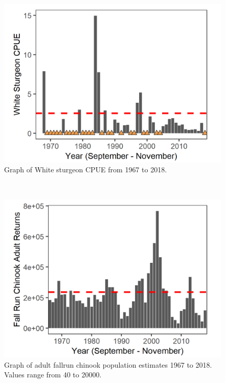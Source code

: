 \documentclass[
]{book}
\begin{document}
\begin{panel-grid}
\begin{columns-nocenter}
\begin{column800}
\begin{expand}
\begin{figure}
\includegraphics[width=15.25in]{figures/WST_1966} \caption{Graph of White sturgeon CPUE from 1967 to 2018. }\label{fig:unnamed-chunk-131}
\end{figure}

\end{expand}

\end{column800}

\begin{column40}

~

\end{column40}

\begin{column800}

\begin{expand}

\begin{figure}
\includegraphics[width=15.25in]{figures/FallRun_1966} \caption{Graph of adult fallrun chinook population estimates 1967 to 2018. Values range from 40 to 20000.}\label{fig:unnamed-chunk-132}
\end{figure}


\end{expand}
\end{column800}
\end{columns-nocenter}
\end{panel-grid}
\end{document}
